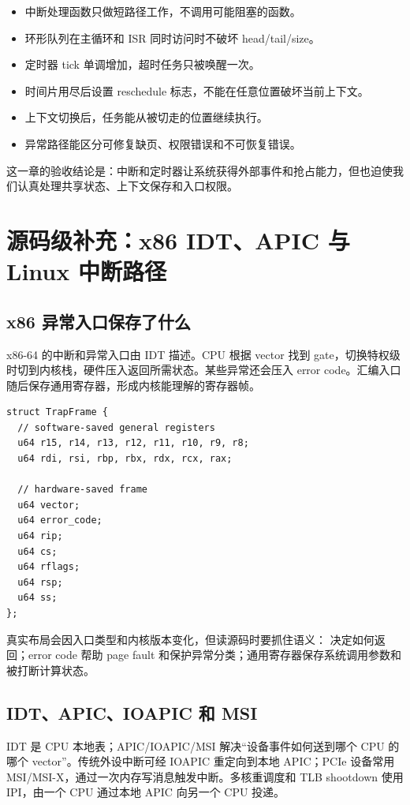 \begin{itemize}
\tightlist
\item 中断处理函数只做短路径工作，不调用可能阻塞的函数。
\item 环形队列在主循环和 ISR 同时访问时不破坏 head/tail/size。
\item 定时器 tick 单调增加，超时任务只被唤醒一次。
\item 时间片用尽后设置 reschedule 标志，不能在任意位置破坏当前上下文。
\item 上下文切换后，任务能从被切走的位置继续执行。
\item 异常路径能区分可修复缺页、权限错误和不可恢复错误。
\end{itemize}

这一章的验收结论是：中断和定时器让系统获得外部事件和抢占能力，但也迫使我们认真处理共享状态、上下文保存和入口权限。

\section{源码级补充：x86 IDT、APIC 与 Linux 中断路径}

\subsection{x86 异常入口保存了什么}

x86-64 的中断和异常入口由 IDT 描述。CPU 根据 vector 找到 gate，切换特权级时切到内核栈，硬件压入返回所需状态。某些异常还会压入 error code。汇编入口随后保存通用寄存器，形成内核能理解的寄存器帧。

\begin{lstlisting}
struct TrapFrame {
  // software-saved general registers
  u64 r15, r14, r13, r12, r11, r10, r9, r8;
  u64 rdi, rsi, rbp, rbx, rdx, rcx, rax;

  // hardware-saved frame
  u64 vector;
  u64 error_code;
  u64 rip;
  u64 cs;
  u64 rflags;
  u64 rsp;
  u64 ss;
};
\end{lstlisting}

真实布局会因入口类型和内核版本变化，但读源码时要抓住语义： 决定如何返回；error code 帮助 page fault 和保护异常分类；通用寄存器保存系统调用参数和被打断计算状态。

\subsection{IDT、APIC、IOAPIC 和 MSI}

IDT 是 CPU 本地表；APIC/IOAPIC/MSI 解决“设备事件如何送到哪个 CPU 的哪个 vector”。传统外设中断可经 IOAPIC 重定向到本地 APIC；PCIe 设备常用 MSI/MSI-X，通过一次内存写消息触发中断。多核重调度和 TLB shootdown 使用 IPI，由一个 CPU 通过本地 APIC 向另一个 CPU 投递。

